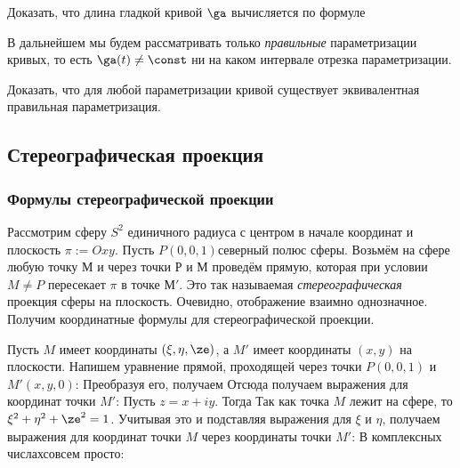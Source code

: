 \documentclass[a4paper]{article}
\begin{document}
\begin{problem}
Доказать, что длина гладкой кривой $\ga$ вычисляется по формуле
\end{problem}

\begin{note}
В дальнейшем мы будем рассматривать только \emph{правильные} параметризации кривых, то есть $\ga(t)\neq\const$ ни на
каком интервале отрезка параметризации.
\end{note}

\begin{problem}
Доказать, что для любой параметризации кривой существует эквивалентная правильная параметризация.
\end{problem}

\subsection{Стереографическая проекция}

\subsubsection{Формулы стереографической проекции}

Рассмотрим сферу $S^2$ единичного радиуса с центром в начале координат и плоскость $\pi := Oxy$.
Пусть $P(0,0,1)$\т северный полюс сферы. Возьмём на сфере любую точку $М$ и через точки $Р$ и $М$
проведём прямую, которая при условии $M \neq P$ пересекает $\pi$ в точке $М'$. Это так называемая
\emph{стереографическая} проекция сферы на плоскость. Очевидно, отображение взаимно
однозначное. Получим координатные формулы для стереографической проекции.

Пусть $M$ имеет координаты $(\xi, \eta, \ze)$, а $M'$ имеет координаты $(x,y)$ на плоскости.
Напишем уравнение прямой, проходящей через точки $P(0,0,1)$ и $M'(x,y,0)$:
Преобразуя его, получаем
Отсюда получаем выражения для координат точки $M'$:
Пусть $z=x+iy$. Тогда
Так как точка $M$ лежит на сфере, то $\xi^2+\eta^2+\ze^2=1$. Учитывая это и подставляя
выражения для $\xi$ и $\eta$, получаем выражения для координат точки $M$ через координаты точки $M'$:
В комплексных числах\т совсем просто:
\end{document}
